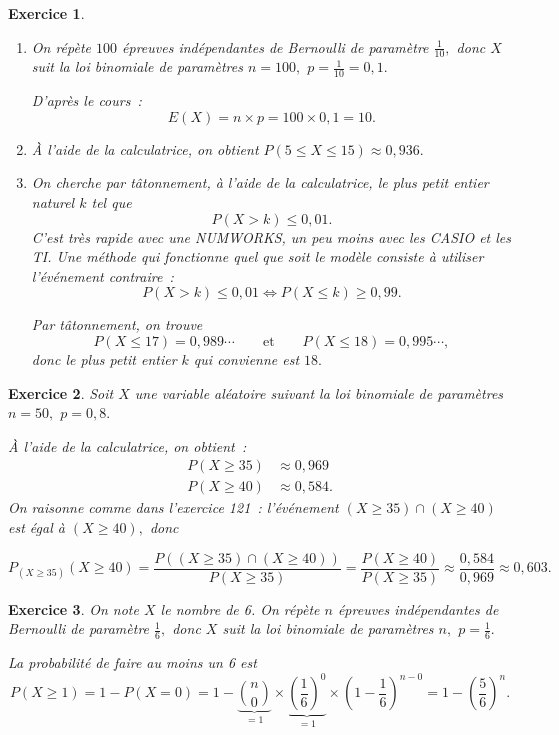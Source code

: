 \documentclass[10pt]{article}
\newtheorem{exo}{Exercice}
\begin{document}
\begin{exo}


 
\begin{enumerate}
\item On répète $100$ épreuves indépendantes de Bernoulli de paramètre $\frac{1}{10},$ donc $X$ suit la loi binomiale de paramètres $n=100, $ $p=\frac{1}{10}=0,1.$

\medskip

D'après le  cours~:
\[E(X)=n\times p=100\times 0,1=10.\]%
\item À l'aide de la calculatrice, on obtient $P(5\leq X\leq 15)\approx 0,936.$
\item On cherche par tâtonnement, à l'aide de la calculatrice, le plus petit entier naturel $k$ tel que \[P(X> k)\leq 0,01.\] C'est très rapide avec une NUMWORKS, un peu moins avec les CASIO et les TI. Une méthode qui fonctionne quel que soit le modèle consiste à utiliser l'événement contraire~:
\[ P(X> k)\leq 0,01\iff P(X\leq k)\geq 0,99.\]

Par tâtonnement, on trouve 
\[P(X\leq 17)=0,989\cdots\qquad\text{et}\qquad P(X\leq 18)=0,995\cdots,\] donc le plus petit entier $k$ qui convienne est $18.$

\end{enumerate}
\end{exo}

\begin{exo}

Soit $X$ une variable aléatoire suivant la loi binomiale de paramètres $n=50,$ $p=0,8.$

\`A l'aide de la calculatrice, on obtient~:
\begin{align*}
P(X\geq 35)&\approx 0,969\\
P(X\geq 40)&\approx 0,584.
\end{align*}
On raisonne comme dans l'exercice 121~: l'événement  $(X\geq 35)\cap (X\geq 40)$ est égal à $(X\geq 40),$ donc

\[P_{(X\geq 35)}(X\geq 40)=\frac{P((X\geq 35)\cap (X\geq 40))}{P(X\geq 35)}
=\frac{P(X\geq 40)}{P(X\geq 35)}\approx \frac{0,584}{0,969}\approx 0,603.\]

\end{exo}




\begin{exo}


On note $X$ le nombre de 6. On répète $n$ épreuves indépendantes de Bernoulli de paramètre $\frac{1}{6},$ donc $X$ suit la loi binomiale de paramètres $n, $ $p=\frac{1}{6}.$

\medskip

La probabilité de faire au moins un 6 est 
\[P(X\geq 1)=1-P(X=0)=1-\underbrace{\binom{n}{0}}_{=1}\times \underbrace{\left(\frac{1}{6}\right)^0}_{=1}\times\left(1-\frac{1}{6}\right)^{n-0}=1-\left(\frac{5}{6}\right)^{n}.\]
\end{exo}
\end{document}
